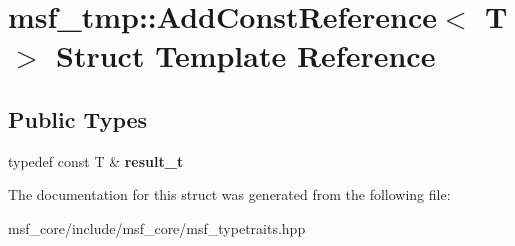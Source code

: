 \hypertarget{structmsf__tmp_1_1AddConstReference}{\section{msf\-\_\-tmp\-:\-:Add\-Const\-Reference$<$ T $>$ Struct Template Reference}
\label{structmsf__tmp_1_1AddConstReference}
}
\subsection*{Public Types}
\begin{DoxyCompactItemize}
\item 
\hypertarget{structmsf__tmp_1_1AddConstReference_a39b31264ec47bd917d89118bdfea00d7}{typedef const T \& {\bfseries result\-\_\-t}}\label{structmsf__tmp_1_1AddConstReference_a39b31264ec47bd917d89118bdfea00d7}

\end{DoxyCompactItemize}


The documentation for this struct was generated from the following file\-:\begin{DoxyCompactItemize}
\item 
msf\-\_\-core/include/msf\-\_\-core/msf\-\_\-typetraits.\-hpp\end{DoxyCompactItemize}

